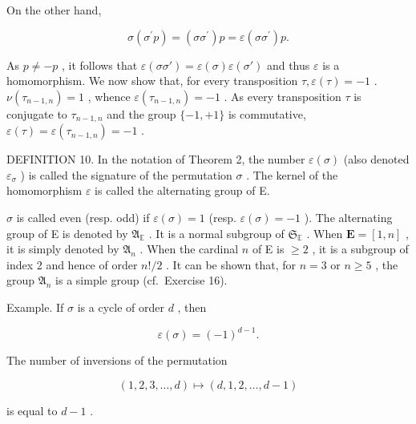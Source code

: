 On the other hand,

\[
\sigma (\sigma^ {\prime} p) = (\sigma \sigma^ {\prime}) p = \varepsilon (\sigma \sigma^ {\prime}) p.
\]

As \(p \neq -p\) , it follows that \(\varepsilon(\sigma\sigma') = \varepsilon(\sigma)\varepsilon(\sigma')\) and thus \(\varepsilon\) is a homomorphism. We now show that, for every transposition \(\tau, \varepsilon(\tau) = -1\) . \(\nu(\tau_{n-1,n}) = 1\) , whence \(\varepsilon(\tau_{n-1,n}) = -1\) . As every transposition \(\tau\) is conjugate to \(\tau_{n-1,n}\) and the group \(\{-1, +1\}\) is commutative, \(\varepsilon(\tau) = \varepsilon(\tau_{n-1,n}) = -1\) .

DEFINITION 10. In the notation of Theorem 2, the number \(\varepsilon(\sigma)\) (also denoted \(\varepsilon_{\sigma}\) ) is called the signature of the permutation \(\sigma\) . The kernel of the homomorphism \(\varepsilon\) is called the alternating group of E.

\(\sigma\) is called even (resp. odd) if \(\varepsilon(\sigma) = 1\) (resp. \(\varepsilon(\sigma) = -1\) ). The alternating group of E is denoted by \(\mathfrak{A}_{\mathbb{E}}\) . It is a normal subgroup of \(\mathfrak{S}_{\mathbb{E}}\) . When \(\mathbf{E} = [1, n]\) , it is simply denoted by \(\mathfrak{A}_{n}\) . When the cardinal \(n\) of E is \(\geqslant 2\) , it is a subgroup of index 2 and hence of order \(n! / 2\) . It can be shown that, for \(n = 3\) or \(n \geqslant 5\) , the group \(\mathfrak{A}_{n}\) is a simple group (cf.~Exercise 16).

Example. If \(\sigma\) is a cycle of order \(d\) , then

\[
\varepsilon (\sigma) = (- 1) ^ {d - 1}.
\]

The number of inversions of the permutation

\[
(1, 2, 3, \dots , d) \mapsto (d, 1, 2, \dots , d - 1)
\]

is equal to \(d - 1\) .

